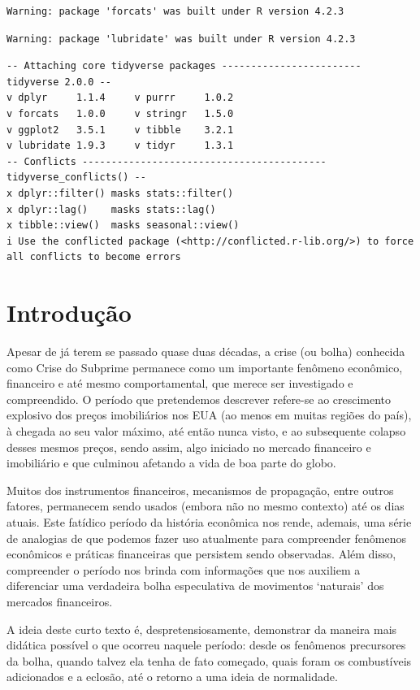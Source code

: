 \documentclass[
  portuguese,
  letterpaper,
  DIV=11,
  numbers=noendperiod,
  oneside]{scrartcl}
\begin{document}
\begin{verbatim}
Warning: package 'forcats' was built under R version 4.2.3
\end{verbatim}

\begin{verbatim}
Warning: package 'lubridate' was built under R version 4.2.3
\end{verbatim}

\begin{verbatim}
-- Attaching core tidyverse packages ------------------------ tidyverse 2.0.0 --
v dplyr     1.1.4     v purrr     1.0.2
v forcats   1.0.0     v stringr   1.5.0
v ggplot2   3.5.1     v tibble    3.2.1
v lubridate 1.9.3     v tidyr     1.3.1
-- Conflicts ------------------------------------------ tidyverse_conflicts() --
x dplyr::filter() masks stats::filter()
x dplyr::lag()    masks stats::lag()
x tibble::view()  masks seasonal::view()
i Use the conflicted package (<http://conflicted.r-lib.org/>) to force all conflicts to become errors
\end{verbatim}

\section{Introdução}\label{introduuxe7uxe3o}

Apesar de já terem se passado quase duas décadas, a crise (ou bolha)
conhecida como Crise do Subprime permanece como um importante fenômeno
econômico, financeiro e até mesmo comportamental, que merece ser
investigado e compreendido. O período que pretendemos descrever
refere-se ao crescimento explosivo dos preços imobiliários nos EUA (ao
menos em muitas regiões do país), à chegada ao seu valor máximo, até
então nunca visto, e ao subsequente colapso desses mesmos preços, sendo
assim, algo iniciado no mercado financeiro e imobiliário e que culminou
afetando a vida de boa parte do globo.

Muitos dos instrumentos financeiros, mecanismos de propagação, entre
outros fatores, permanecem sendo usados (embora não no mesmo contexto)
até os dias atuais. Este fatídico período da história econômica nos
rende, ademais, uma série de analogias de que podemos fazer uso
atualmente para compreender fenômenos econômicos e práticas financeiras
que persistem sendo observadas. Além disso, compreender o período nos
brinda com informações que nos auxiliem a diferenciar uma verdadeira
bolha especulativa de movimentos `naturais' dos mercados financeiros.

A ideia deste curto texto é, despretensiosamente, demonstrar da maneira
mais didática possível o que ocorreu naquele período: desde os fenômenos
precursores da bolha, quando talvez ela tenha de fato começado, quais
foram os combustíveis adicionados e a eclosão, até o retorno a uma ideia
de normalidade.
\end{document}
